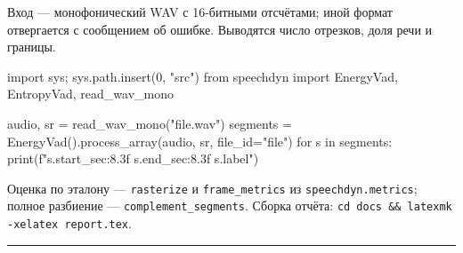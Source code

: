 \documentclass[11pt,a4paper]{article}
\theoremstyle{definition}
\theoremstyle{plain}
\newcommand{\code}[1]{\texttt{#1}}
\begin{document}
Вход --- монофонический WAV с 16-битными отсчётами; иной формат отвергается с
сообщением об ошибке. Выводятся число отрезков, доля речи и границы.

\begin{PyCode}
import sys; sys.path.insert(0, "src")
from speechdyn import EnergyVad, EntropyVad, read_wav_mono

audio, sr = read_wav_mono("file.wav")
segments = EnergyVad().process_array(audio, sr, file_id="file")
for s in segments:
    print(f"{s.start_sec:8.3f} {s.end_sec:8.3f} {s.label}")
\end{PyCode}

Оценка по эталону --- \code{rasterize} и \code{frame\_metrics} из
\code{speechdyn.metrics}; полное разбиение --- \code{complement\_segments}.
Сборка отчёта: \code{cd docs \&\& latexmk -xelatex report.tex}.

\bigskip\hrule\bigskip
\noindent\footnotesize
\end{document}
